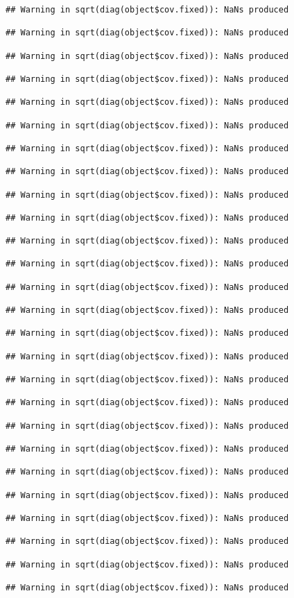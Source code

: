 \documentclass[
]{article}
\begin{document}
\begin{verbatim}
## Warning in sqrt(diag(object$cov.fixed)): NaNs produced

## Warning in sqrt(diag(object$cov.fixed)): NaNs produced

## Warning in sqrt(diag(object$cov.fixed)): NaNs produced

## Warning in sqrt(diag(object$cov.fixed)): NaNs produced

## Warning in sqrt(diag(object$cov.fixed)): NaNs produced

## Warning in sqrt(diag(object$cov.fixed)): NaNs produced

## Warning in sqrt(diag(object$cov.fixed)): NaNs produced

## Warning in sqrt(diag(object$cov.fixed)): NaNs produced

## Warning in sqrt(diag(object$cov.fixed)): NaNs produced

## Warning in sqrt(diag(object$cov.fixed)): NaNs produced

## Warning in sqrt(diag(object$cov.fixed)): NaNs produced

## Warning in sqrt(diag(object$cov.fixed)): NaNs produced

## Warning in sqrt(diag(object$cov.fixed)): NaNs produced

## Warning in sqrt(diag(object$cov.fixed)): NaNs produced

## Warning in sqrt(diag(object$cov.fixed)): NaNs produced

## Warning in sqrt(diag(object$cov.fixed)): NaNs produced

## Warning in sqrt(diag(object$cov.fixed)): NaNs produced

## Warning in sqrt(diag(object$cov.fixed)): NaNs produced

## Warning in sqrt(diag(object$cov.fixed)): NaNs produced

## Warning in sqrt(diag(object$cov.fixed)): NaNs produced

## Warning in sqrt(diag(object$cov.fixed)): NaNs produced

## Warning in sqrt(diag(object$cov.fixed)): NaNs produced

## Warning in sqrt(diag(object$cov.fixed)): NaNs produced

## Warning in sqrt(diag(object$cov.fixed)): NaNs produced

## Warning in sqrt(diag(object$cov.fixed)): NaNs produced

## Warning in sqrt(diag(object$cov.fixed)): NaNs produced


\end{verbatim}
\end{document}
